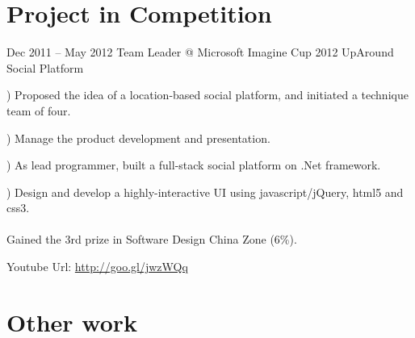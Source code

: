 \documentclass{tccv}
\begin{document}
\section{Project in Competition}
\begin{eventlist}

\item{Dec 2011 -- May 2012}
     {Team Leader @ Microsoft Imagine Cup 2012}
     {UpAround Social Platform}
     
     ) Proposed the idea of a location-based social platform, and initiated a technique team of four.
     
     ) Manage the product development and presentation.
     
     ) As lead programmer, built a full-stack social platform on .Net framework. 
     
     ) Design and develop a highly-interactive UI using javascript/jQuery, html5 and css3.
     \\\\
Gained the 3rd prize in Software Design China Zone (6\%).   

Youtube Url: \underline{http://goo.gl/jwzWQq}
       
\end{eventlist}

















\section{Other work}
\end{document}
